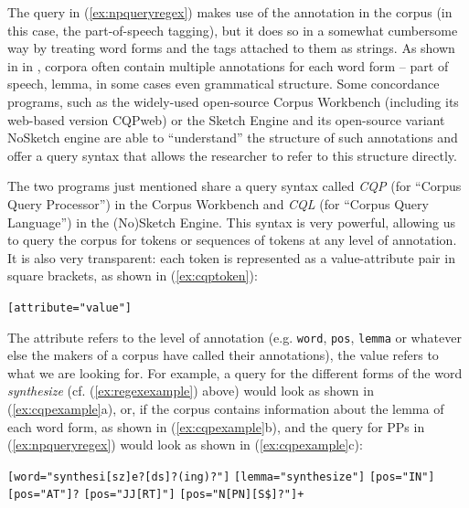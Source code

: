 The query  in (\ref{ex:npqueryregex}) makes use of the annotation  in the corpus (in this case, the part\hyp{}of\hyp{}speech tagging),  but it does so in a somewhat cumbersome way by treating word forms and the tags attached to them as strings. As shown in  in , corpora often contain multiple annotations  for each word form -- part of speech, lemma,  in some cases even grammatical structure. Some concordance  programs, such as the widely\hyp{}used open\hyp{}source Corpus Workbench (including its web\hyp{}based version CQPweb) \citep[cf.][]{evert_twenty-first_2011} or the Sketch Engine and its open\hyp{}source variant NoSketch engine \citep[cf.][]{kilgarriff_sketch_2014} are able to ``understand'' the structure of such annotations  and offer a query  syntax that allows the researcher to refer to this structure directly.

The two programs just mentioned share a query  syntax called \emph{CQP} (for ``Corpus Query Processor'') in the Corpus Workbench and \emph{CQL} (for ``Corpus Query Language'') in the (No)Sketch Engine. This syntax is very powerful, allowing us to query the corpus for tokens or sequences of tokens at any level of annotation.  It is also very transparent: each token is represented as a value\hyp{}attribute pair in square brackets, as shown in (\ref{ex:cqptoken}):

\begin{exe}
\ex \texttt{[attribute="value"]}
\label{ex:cqptoken}
\end{exe}

The attribute refers to the level of annotation  (e.g. \texttt{word}, \texttt{pos}, \texttt{lemma}  or whatever else the makers of a corpus have called their annotations), the value refers to what we are looking for. For example, a query  for the different forms of the word \textit{synthesize} (cf. (\ref{ex:regexexample}) above) would look as shown in (\ref{ex:cqpexample}a), or, if the corpus contains information about the lemma of each word form, as shown in (\ref{ex:cqpexample}b), and the query for PPs in (\ref{ex:npqueryregex}) would look as shown in (\ref{ex:cqpexample}c):

\begin{exe}
\ex
\begin{xlist}
\label{ex:cqpexample}
\ex \texttt{[word="synthesi[sz]e?[ds]?(ing)?"]}
\ex \texttt{[lemma="synthesize"]}
\ex \texttt{[pos="IN"]} \texttt{[pos="AT"]?} \texttt{[pos="JJ[RT]"]\*} \texttt{[pos="N[PN][S\$]?"]+}
\end{xlist}
\end{exe}

